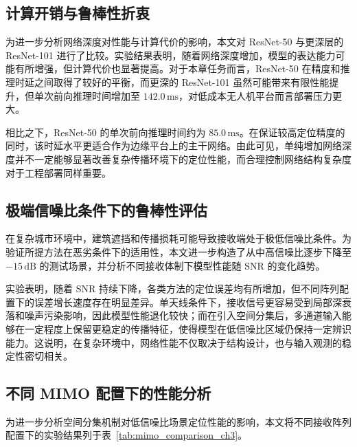 \subsection{计算开销与鲁棒性折衷}
\label{subsec:3_6_2}

为进一步分析网络深度对性能与计算代价的影响，本文对 ResNet-50 与更深层的 ResNet-101 进行了比较。实验结果表明，随着网络深度增加，模型的表达能力可能有所增强，但计算代价也显著提高。对于本章任务而言，ResNet-50 在精度和推理时延之间取得了较好的平衡，而更深的 ResNet-101 虽然可能带来有限性能提升，但单次前向推理时间增加至 \(142.0\,\mathrm{ms}\)，对低成本无人机平台而言部署压力更大。

相比之下，ResNet-50 的单次前向推理时间约为 \(85.0\,\mathrm{ms}\)。在保证较高定位精度的同时，该时延水平更适合作为边缘平台上的主干网络。由此可见，单纯增加网络深度并不一定能够显著改善复杂传播环境下的定位性能，而合理控制网络结构复杂度对于工程部署同样重要。

\subsection{极端信噪比条件下的鲁棒性评估}
\label{subsec:3_6_3}

在复杂城市环境中，建筑遮挡和传播损耗可能导致接收端处于极低信噪比条件。为验证所提方法在恶劣条件下的适用性，本文进一步构造了从中高信噪比逐步下降至 \(-15\,\mathrm{dB}\) 的测试场景，并分析不同接收体制下模型性能随 SNR 的变化趋势。

实验表明，随着 SNR 持续下降，各类方法的定位误差均有所增加，但不同阵列配置下的误差增长速度存在明显差异。单天线条件下，接收信号更容易受到局部深衰落和噪声污染影响，因此模型性能退化较快；而在引入空间分集后，多通道输入能够在一定程度上保留更稳定的传播特征，使得模型在低信噪比区域仍保持一定辨识能力。这说明，在复杂环境中，网络性能不仅取决于结构设计，也与输入观测的稳定性密切相关。

\subsection{不同 MIMO 配置下的性能分析}
\label{subsec:3_6_4}

为进一步分析空间分集机制对低信噪比场景定位性能的影响，本文将不同接收阵列配置下的实验结果列于表~\ref{tab:mimo_comparison_ch3}。

